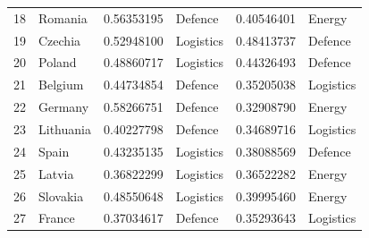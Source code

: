 \begin{longtable}{@{}rlS[table-format=1.8]lS[table-format=1.8]l@{}}
  18 & Romania & 0.56353195 & Defence & 0.40546401 & Energy \\
  19 & Czechia & 0.52948100 & Logistics & 0.48413737 & Defence \\
  20 & Poland & 0.48860717 & Logistics & 0.44326493 & Defence \\
  21 & Belgium & 0.44734854 & Defence & 0.35205038 & Logistics \\
  22 & Germany & 0.58266751 & Defence & 0.32908790 & Energy \\
  23 & Lithuania & 0.40227798 & Defence & 0.34689716 & Logistics \\
  24 & Spain & 0.43235135 & Logistics & 0.38088569 & Defence \\
  25 & Latvia & 0.36822299 & Logistics & 0.36522282 & Energy \\
  26 & Slovakia & 0.48550648 & Logistics & 0.39995460 & Energy \\
  27 & France & 0.37034617 & Defence & 0.35293643 & Logistics \\
\end{longtable}